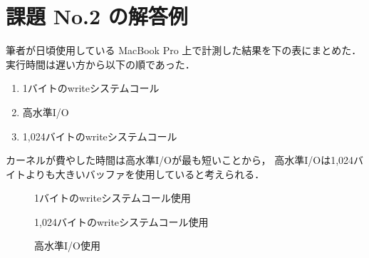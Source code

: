 \documentclass[a4j,twcolumn,11pt,nomag]{ltjarticle}      %
\begin{document}
\onecolumn
\section*{課題 No.2 の解答例}
筆者が日頃使用している MacBook Pro 上で計測した結果を下の表にまとめた．
実行時間は遅い方から以下の順であった．

\begin{enumerate}
\item 1バイトのwriteシステムコール
\item 高水準I/O
\item 1,024バイトのwriteシステムコール
\end{enumerate}

カーネルが費やした時間は高水準I/Oが最も短いことから，
高水準I/Oは1,024バイトよりも大きいバッファを使用していると考えられる．

\begin{figure}[h]
  \begin{center}
  1バイトのwriteシステムコール使用\\
  \end{center}
\end{figure}

\begin{figure}[h]
  \begin{center}
    1,024バイトのwriteシステムコール使用\\
  \end{center}
\end{figure}

\begin{figure}[h]
  \begin{center}
    高水準I/O使用\\
  \end{center}
\end{figure}
\end{document}
